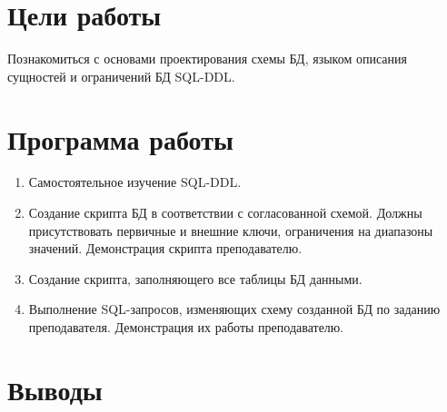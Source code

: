 





\tableofcontents
\newpage

\section{Цели работы}

Познакомиться с основами проектирования схемы БД, языком описания сущностей и ограничений БД SQL-DDL.

\section{Программа работы}

\begin{enumerate}
	\item Самостоятельное изучение SQL-DDL.
	\item Создание скрипта БД в соответствии с согласованной схемой. Должны присутствовать первичные и внешние ключи, ограничения на диапазоны значений. Демонстрация скрипта преподавателю. 
	\item Создание скрипта, заполняющего все таблицы БД данными.
	\item Выполнение SQL-запросов, изменяющих схему созданной БД по заданию преподавателя. Демонстрация их работы преподавателю.
\end{enumerate}
 


\section{Выводы}



